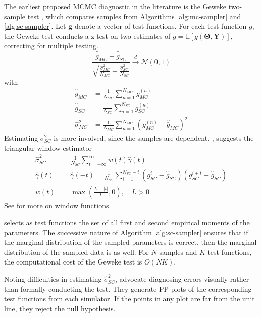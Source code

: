 \documentclass[a4paper,12pt]{article}
\newcommand{\E}{\mathbb{E}}
\begin{document}
The earliest proposed MCMC diagnostic in the literature is the Geweke two-sample test \cite{geweke_getting_2004}, which compares samples from Algorithms \ref{alg:mc-sampler} and \ref{alg:sc-sampler}. Let $\mathbf{g}$ denote a vector of test functions. For each test function $g$, the Geweke test conducts a z-test on two estimates of $\bar{g} = \E[g(\mathbf{\Theta}, \mathbf{Y})]$, correcting for multiple testing.
\begin{equation}
    \frac{\hat{\bar{g}}_{MC} - \hat{\bar{g}}_{SC}}{\sqrt{ \frac{\hat{\sigma}^{2}_{MC}}{N_{MC}} + \frac{\hat{\sigma}^{2}_{SC}}{N_{SC}}}} \xrightarrow[]{d} \mathcal{N}(0, 1)
    \label{eq:geweke}
\end{equation}
with
\begin{align}
    \hat{\bar{g}}_{MC} &= \frac{1}{N_{MC}}\sum_{n=1}^{N_{MC}}g_{MC}^{(n)} \\ \hat{\bar{g}}_{SC} &= \frac{1}{N_{SC}}\sum_{n=1}^{N_{SC}}g_{SC}^{(n)} \\
    \hat{\sigma}_{MC}^{2} &= \frac{1}{N_{MC}}\sum_{n=1}^{N_{MC}}(g_{MC}^{(n)} - \hat{\bar{g}}_{MC})^{2}
\end{align}
Estimating $\sigma_{SC}^{2}$ is more involved, since the samples are dependent. \cite{geweke_using_1999}, suggests the triangular window estimator
\begin{align*}
    \hat{\sigma}_{SC}^{2} &= \frac{1}{N_{SC}}\sum_{t=-\infty}^{\infty} w(t) \hat{\gamma}(t) \\
    \hat{\gamma}(t) &= \hat{\gamma}(-t) = \frac{1}{N_{SC}}\sum_{i=1}^{N_{SC}-t}(g_{SC}^{i} - \hat{\bar{g}}_{SC})(g_{SC}^{i+t} - \hat{\bar{g}}_{SC}) \\
    w(t) &= \max{\left(\frac{L-|t|}{L}, 0\right)}, \quad L > 0
\end{align*}
See \cite{priestley_spectral_1981} for more on window functions.

\cite{geweke_getting_2004} selects as test functions the set of all first and second empirical moments of the parameters. The successive nature of Algorithm \ref{alg:sc-sampler} ensures that if the marginal distribution of the sampled parameters is correct, then the marginal distribution of the sampled data is as well. For $N$ samples and $K$ test functions, the computational cost of the Geweke test is $O(NK)$. 

Noting difficulties in estimating $\hat{\sigma}_{SC}^{2}$, \cite{grosse_testing_2014} advocate diagnosing errors visually rather than formally conducting the test. They generate PP plots of the corresponding test functions from each simulator. If the points in any plot are far from the unit line, they reject the null hypothesis.
\end{document}
